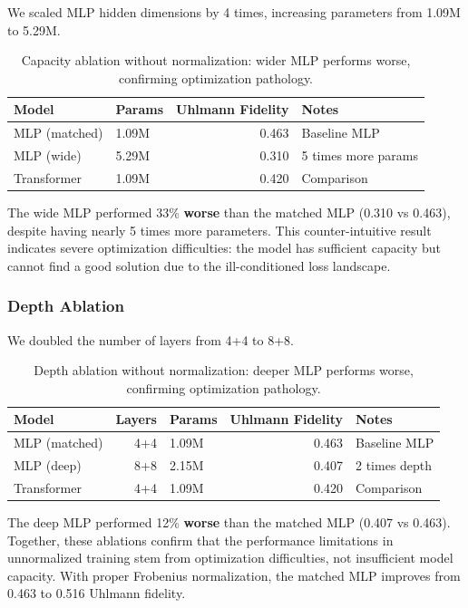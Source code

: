 \documentclass[11pt]{article}
\begin{document}
We scaled MLP hidden dimensions by 4 times, increasing parameters from 1.09M to 5.29M.

\begin{table}[htbp]
\caption{\label{tab:org9aee1b8}Capacity ablation without normalization: wider MLP performs worse, confirming optimization pathology.}
\centering
\begin{tabular}{llrl}
Model & Params & Uhlmann Fidelity & Notes\\
\hline
MLP (matched) & 1.09M & 0.463 & Baseline MLP\\
MLP (wide) & 5.29M & 0.310 & 5 times more params\\
Transformer & 1.09M & 0.420 & Comparison\\
\end{tabular}
\end{table}

The wide MLP performed 33\% \textbf{worse} than the matched MLP (0.310 vs 0.463), despite having nearly 5 times more parameters. This counter-intuitive result indicates severe optimization difficulties: the model has sufficient capacity but cannot find a good solution due to the ill-conditioned loss landscape.
\subsubsection{Depth Ablation}
\label{sec:orgd87e1d0}

We doubled the number of layers from 4+4 to 8+8.

\begin{table}[htbp]
\caption{\label{tab:org513eabb}Depth ablation without normalization: deeper MLP performs worse, confirming optimization pathology.}
\centering
\begin{tabular}{lrlrl}
Model & Layers & Params & Uhlmann Fidelity & Notes\\
\hline
MLP (matched) & 4+4 & 1.09M & 0.463 & Baseline MLP\\
MLP (deep) & 8+8 & 2.15M & 0.407 & 2 times depth\\
Transformer & 4+4 & 1.09M & 0.420 & Comparison\\
\end{tabular}
\end{table}

The deep MLP performed 12\% \textbf{worse} than the matched MLP (0.407 vs 0.463). Together, these ablations confirm that the performance limitations in unnormalized training stem from optimization difficulties, not insufficient model capacity. With proper Frobenius normalization, the matched MLP improves from 0.463 to 0.516 Uhlmann fidelity.
\end{document}
